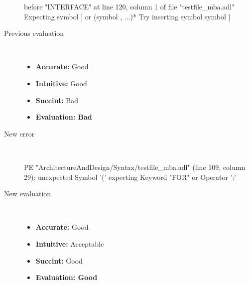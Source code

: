 \begin{description}
\begin{haskell}
before "INTERFACE" at line 120, column 1 of file "testfile_mba.adl"
Expecting symbol ] or (symbol , ...)*
Try inserting symbol symbol ]
\end{haskell}
  \item[Previous evaluation]~\\
    \begin{itemize}
    \item \textbf{Accurate:} Good
    \item \textbf{Intuitive:} Good
    \item \textbf{Succint:} Bad
    \item \textbf{Evaluation: Bad}
    \end{itemize}
  \item[New error]~\\
\begin{haskell}
PE "ArchitectureAndDesign/Syntax/testfile_mba.adl" (line 109, column 29):
unexpected Symbol '('
expecting Keyword "FOR" or Operator ':'\end{haskell}
  \item[New evaluation]~\\
    \begin{itemize}
    \item \textbf{Accurate:} Good
    \item \textbf{Intuitive:} Acceptable
    \item \textbf{Succint:} Good
    \item \textbf{Evaluation: Good
}
    \end{itemize}
  \end{description}

\hrulefill

